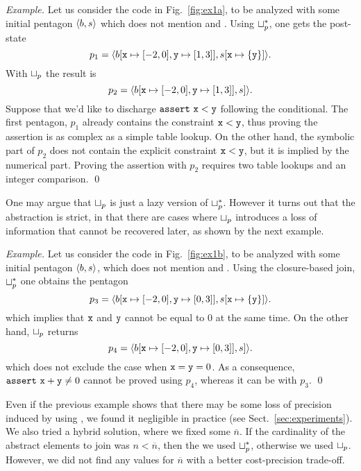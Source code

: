 \documentclass{sig-alternate}
\begin{document}
\textit{Example.}
Let us consider the code in Fig.~\ref{fig:ex1a}, to be analyzed with some initial pentagon $\langle b, s \rangle$ which does not mention  and .
Using $\sqcup_p^*$, one gets the post-state 
\[ 
p_1 = \langle b[\mathtt{x} \mapsto [-2, 0], \allowbreak \mathtt{y} \mapsto [1, 3]], \allowbreak s[\mathtt{x} \mapsto \{ \mathtt{y} \} ] \rangle.
\]
With $\sqcup_p$ the result is 
\[
p_2 = \langle b[\mathtt{x} \mapsto [-2, 0], \allowbreak \mathtt{y} \mapsto [1,3]], \allowbreak s] \rangle.
\]
Suppose that we'd like to discharge $\mathtt{assert\ x < y}$ following the conditional.
The first pentagon, $p_1$ already contains the constraint $\mathtt{x} <
\mathtt{y}$, thus proving the assertion is as complex as a simple  table lookup.
On the other hand, the symbolic part of $p_2$ does not contain the
explicit constraint $\mathtt{x} < \mathtt{y}$, but it is implied by the
numerical part. Proving the assertion with $p_2$ requires two table lookups and an integer comparison. 
\qed
 
One may argue that  $\sqcup_p$ is just a lazy version of $\sqcup_p^*$. 
However it turns out that the abstraction is strict, in that there are cases where $\sqcup_p$ introduces a loss of information that cannot be recovered later, as shown by the next example.

\textit{Example.}
Let us consider the code in Fig.~\ref{fig:ex1b}, to be analyzed with some initial pentagon $\langle b, s \rangle$, which does not mention  and .
Using the closure-based join, $\sqcup_p^*$ one obtains the pentagon
\[ 
p_3 = \langle b[\mathtt{x} \mapsto [-2, 0], \allowbreak \mathtt{y} \mapsto [0, 3]], \allowbreak s[\mathtt{x} \mapsto \{ \mathtt{y} \} ] \rangle.
\]
which implies that $\mathtt{x}$ and $\mathtt{y}$ cannot be equal to $0$ at the same time.
On the other hand, $\sqcup_p$ returns
\[
p_4 = \langle b[\mathtt{x} \mapsto [-2, 0], \allowbreak \mathtt{y} \mapsto [0,3]], \allowbreak s] \rangle.
\] 
which does not exclude the case when $\mathtt{x} = \mathtt{y} = 0$.
As a consequence, $\mathtt{assert}\ \mathtt{x} + \mathtt{y} \neq 0$ cannot be proved using $p_4$, whereas it can be with $p_3$.
\qed

Even if the previous example shows that there may be some loss of
precision induced by using \pjoin, we found it negligible in practice
(see Sect.~\ref{sec:experiments}).
We also tried a hybrid solution, where we fixed some
$\overline{n}$. If the cardinality of the abstract elements to join
was $n<\overline{n}$, then the we used $\sqcup_p^*$, otherwise we used
$\sqcup_p$. However, we did not find any values for $\overline{n}$ with
a better cost-precision trade-off.
\end{document}
